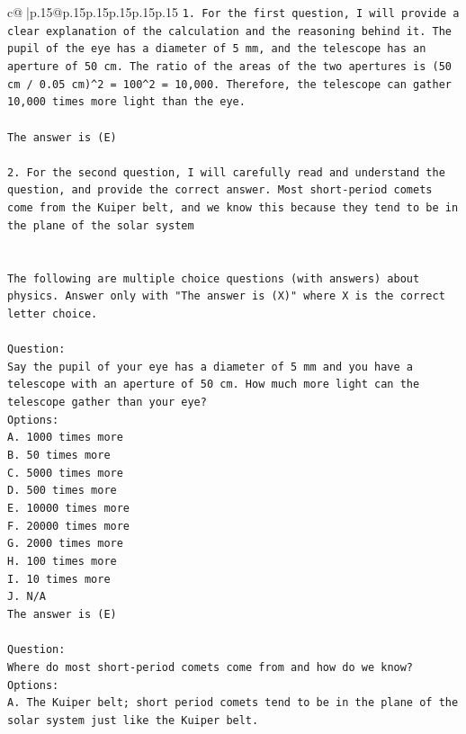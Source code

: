 \documentclass{article}
\begin{document}
{\begin{supertabular}{c@{$\;$}|p{.15\linewidth}@{}p{.15\linewidth}p{.15\linewidth}p{.15\linewidth}p{.15\linewidth}p{.15\linewidth}}
{{{\texttt{1. For the first question, I will provide a clear explanation of the calculation and the reasoning behind it. The pupil of the eye has a diameter of 5 mm, and the telescope has an aperture of 50 cm. The ratio of the areas of the two apertures is (50 cm / 0.05 cm)\^{}2 = 100\^{}2 = 10,000. Therefore, the telescope can gather 10,000 times more light than the eye.} \\
\\ 
\texttt{The answer is (E)} \\
\\ 
\texttt{2. For the second question, I will carefully read and understand the question, and provide the correct answer. Most short{-}period comets come from the Kuiper belt, and we know this because they tend to be in the plane of the solar system} \\
\\ 
\\ 
\texttt{The following are multiple choice questions (with answers) about physics. Answer only with "The answer is (X)" where X is the correct letter choice.} \\
\\ 
\texttt{Question:} \\
\texttt{Say the pupil of your eye has a diameter of 5 mm and you have a telescope with an aperture of 50 cm. How much more light can the telescope gather than your eye?} \\
\texttt{Options:} \\
\texttt{A. 1000 times more} \\
\texttt{B. 50 times more} \\
\texttt{C. 5000 times more} \\
\texttt{D. 500 times more} \\
\texttt{E. 10000 times more} \\
\texttt{F. 20000 times more} \\
\texttt{G. 2000 times more} \\
\texttt{H. 100 times more} \\
\texttt{I. 10 times more} \\
\texttt{J. N/A} \\
\texttt{The answer is (E)} \\
\\ 
\texttt{Question:} \\
\texttt{Where do most short{-}period comets come from and how do we know?} \\
\texttt{Options:} \\
\texttt{A. The Kuiper belt; short period comets tend to be in the plane of the solar system just like the Kuiper belt.} \\
}}}
\end{supertabular}}
\end{document}
